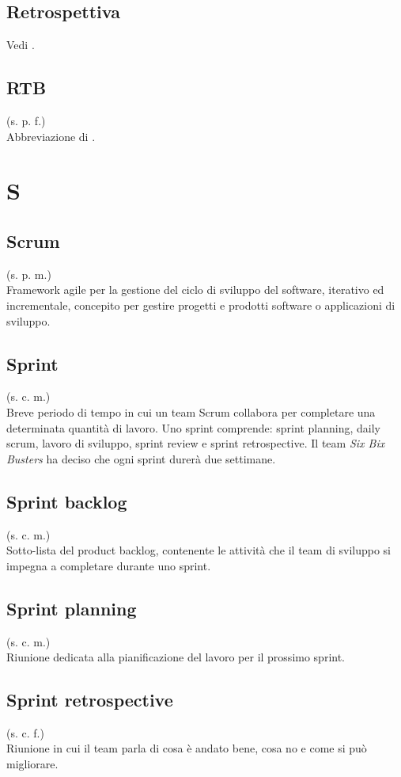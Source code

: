     \subsection{Retrospettiva}
    Vedi .
    \subsection{RTB}
    (s. p. f.)\\
    Abbreviazione di .
\pagebreak
\section{S}
    \subsection{Scrum}
    (s. p. m.)\\
    Framework agile per la gestione del ciclo di sviluppo del software, 
    iterativo ed incrementale, concepito per gestire progetti e prodotti software 
    o applicazioni di sviluppo.
    \subsection{Sprint}
    \label{Sprint}
    (s. c. m.)\\
    Breve periodo di tempo in cui un team Scrum collabora per completare 
    una determinata quantità di lavoro. Uno sprint comprende:  
    sprint planning, daily scrum, lavoro di sviluppo, 
    sprint review e sprint retrospective. Il team \textit{Six Bix Busters} ha 
    deciso che ogni sprint durerà due settimane.
    \subsection{Sprint backlog}   
    \label{Sprint backlog}
    (s. c. m.)\\
    Sotto-lista del product backlog, contenente le attività che il team di sviluppo 
    si impegna a completare durante uno sprint.
    \subsection{Sprint planning}
    (s. c. m.)\\
    Riunione dedicata alla pianificazione del lavoro per il prossimo sprint. 
    \subsection{Sprint retrospective}
    \label{Sprint retrospective}
    (s. c. f.)\\
    Riunione in cui il team parla di cosa è andato bene, cosa no e come si può migliorare.
